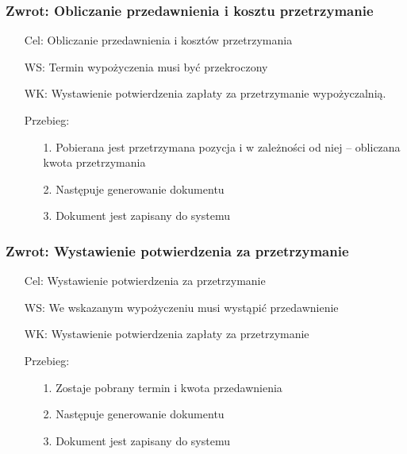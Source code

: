 \documentclass{article}
\begin{document}
\subsubsection{Zwrot: Obliczanie przedawnienia i kosztu przetrzymanie}
\begin{enumerate}
	\item[Cel:] Obliczanie przedawnienia i kosztów przetrzymania
	\item[WS:] Termin wypożyczenia musi być przekroczony
	\item[WK:]  Wystawienie potwierdzenia zapłaty za przetrzymanie wypożyczalnią.
	\item[Przebieg:]
	\begin{enumerate}
		\item [1.]Pobierana jest przetrzymana pozycja i w zależności od niej – obliczana kwota przetrzymania
		\item [2.]Następuje generowanie dokumentu
		\item [3.] Dokument jest zapisany do systemu
	\end{enumerate}
\end{enumerate}
	
\subsubsection{Zwrot: Wystawienie potwierdzenia za przetrzymanie}
	\begin{enumerate}
		\item[Cel:] Wystawienie potwierdzenia za przetrzymanie
		\item[WS:] We wskazanym wypożyczeniu musi wystąpić przedawnienie
		\item[WK:] Wystawienie potwierdzenia zapłaty za przetrzymanie
		\item[Przebieg:]
	\begin{enumerate}
		\item [1.]Zostaje pobrany termin i kwota przedawnienia 
		\item [2.]Następuje generowanie dokumentu
		\item [3.]Dokument jest zapisany do systemu
	\end{enumerate}
	\end{enumerate}
	
\end{document}
